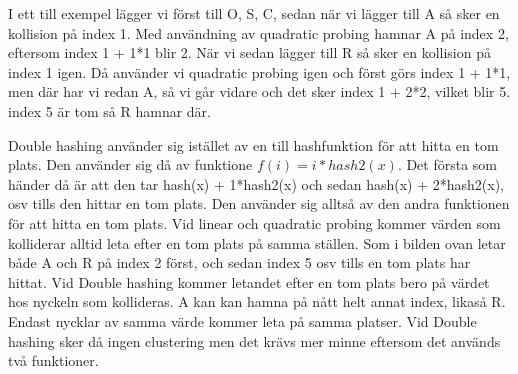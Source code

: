 \documentclass[a5paper,10pt,oneside]{article}
\begin{document}
I ett till exempel lägger vi först till O, S, C, sedan när vi lägger till A så sker en kollision på index 1. Med användning av quadratic probing hamnar A på index 2, eftersom index 1 + 1*1 blir 2. När vi sedan lägger till R så sker en kollision på index 1 igen. Då använder vi quadratic probing igen och först görs index 1 + 1*1, men där har vi redan A, så vi går vidare och det sker index 1 + 2*2, vilket blir 5. index 5 är tom så R hamnar där.

Double hashing använder sig istället av en till hashfunktion för att hitta en tom plats. Den använder sig då av funktione $f(i) =  i*hash2(x)$. Det första som händer då är att den tar hash(x) + 1*hash2(x) och sedan hash(x) + 2*hash2(x), osv tills den hittar en tom plats. Den använder sig alltså av den andra funktionen för att hitta en tom plats. Vid linear och quadratic probing kommer värden som kolliderar alltid leta efter en tom plats på samma ställen. Som i bilden ovan letar både A och R på index 2 först, och sedan index 5 osv tills en tom plats har hittat. Vid Double hashing kommer letandet efter en tom plats bero på värdet hos nyckeln som kollideras. A kan kan hamna på nått helt annat index, likaså R. Endast nycklar av samma värde kommer leta på samma platser. Vid Double hashing sker då ingen clustering men det krävs mer minne eftersom det används två funktioner.
\end{document}
